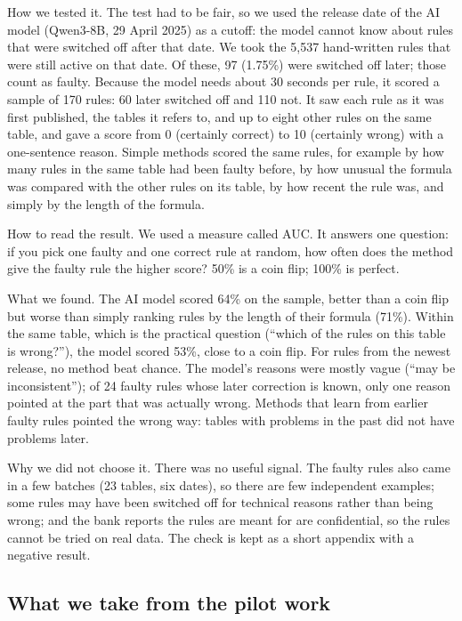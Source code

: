 \documentclass[11pt,a4paper]{article}
\begin{document}
How we tested it. The test had to be fair, so we used the release date of the AI model (Qwen3-8B, 29 April 2025) as a cutoff: the model cannot know about rules that were switched off after that date. We took the 5{,}537 hand-written rules that were still active on that date. Of these, 97 (1.75\%) were switched off later; those count as faulty. Because the model needs about 30 seconds per rule, it scored a sample of 170 rules: 60 later switched off and 110 not. It saw each rule as it was first published, the tables it refers to, and up to eight other rules on the same table, and gave a score from 0 (certainly correct) to 10 (certainly wrong) with a one-sentence reason. Simple methods scored the same rules, for example by how many rules in the same table had been faulty before, by how unusual the formula was compared with the other rules on its table, by how recent the rule was, and simply by the length of the formula.

How to read the result. We used a measure called AUC. It answers one question: if you pick one faulty and one correct rule at random, how often does the method give the faulty rule the higher score? 50\% is a coin flip; 100\% is perfect.

What we found. The AI model scored 64\% on the sample, better than a coin flip but worse than simply ranking rules by the length of their formula (71\%). Within the same table, which is the practical question (``which of the rules on this table is wrong?''), the model scored 53\%, close to a coin flip. For rules from the newest release, no method beat chance. The model's reasons were mostly vague (``may be inconsistent''); of 24 faulty rules whose later correction is known, only one reason pointed at the part that was actually wrong. Methods that learn from earlier faulty rules pointed the wrong way: tables with problems in the past did not have problems later.

Why we did not choose it. There was no useful signal. The faulty rules also came in a few batches (23 tables, six dates), so there are few independent examples; some rules may have been switched off for technical reasons rather than being wrong; and the bank reports the rules are meant for are confidential, so the rules cannot be tried on real data. The check is kept as a short appendix with a negative result.

\subsection{What we take from the pilot work}
\end{document}

